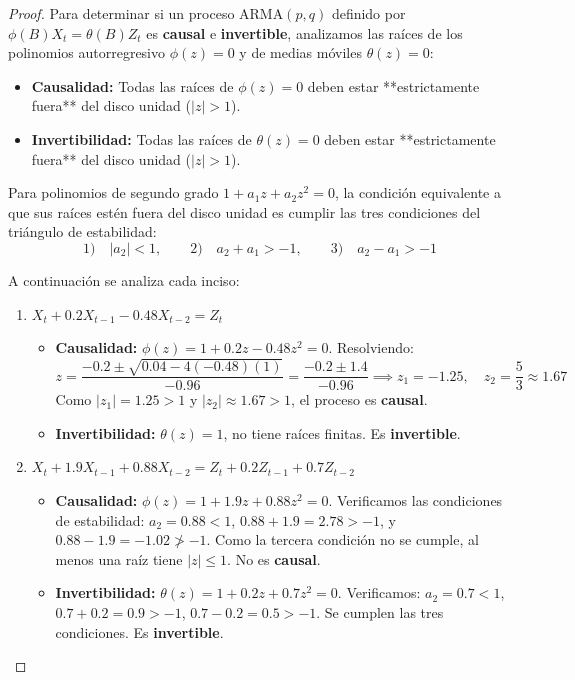 \documentclass[11pt,letterpaper]{article}
\begin{document}
\begin{proof}
Para determinar si un proceso $\text{ARMA}(p,q)$ definido por $\phi(B)X_t = \theta(B)Z_t$ es \textbf{causal} e \textbf{invertible}, analizamos las raíces de los polinomios autorregresivo $\phi(z) = 0$ y de medias móviles $\theta(z) = 0$:

\begin{itemize}
    \item \textbf{Causalidad:} Todas las raíces de $\phi(z) = 0$ deben estar **estrictamente fuera** del disco unidad ($|z| > 1$).
    \item \textbf{Invertibilidad:} Todas las raíces de $\theta(z) = 0$ deben estar **estrictamente fuera** del disco unidad ($|z| > 1$).
\end{itemize}

Para polinomios de segundo grado $1 + a_1 z + a_2 z^2 = 0$, la condición equivalente a que sus raíces estén fuera del disco unidad es cumplir las tres condiciones del triángulo de estabilidad:
\[
1) \quad |a_2| < 1, \qquad 2) \quad a_2 + a_1 > -1, \qquad 3) \quad a_2 - a_1 > -1
\]

A continuación se analiza cada inciso:

\begin{enumerate}
    \item $X_t + 0.2 X_{t-1} - 0.48 X_{t-2} = Z_t$
    \begin{itemize}
        \item \textbf{Causalidad:} $\phi(z) = 1 + 0.2z - 0.48z^2 = 0$. Resolviendo:
        \[
        z = \frac{-0.2 \pm \sqrt{0.04 - 4(-0.48)(1)}}{-0.96} = \frac{-0.2 \pm 1.4}{-0.96} \implies z_1 = -1.25, \quad z_2 = \frac{5}{3} \approx 1.67
        \]
        Como $|z_1| = 1.25 > 1$ y $|z_2| \approx 1.67 > 1$, el proceso es \textbf{causal}.
        \item \textbf{Invertibilidad:} $\theta(z) = 1$, no tiene raíces finitas. Es \textbf{invertible}.
    \end{itemize}

    \item $X_t + 1.9 X_{t-1} + 0.88 X_{t-2} = Z_t + 0.2 Z_{t-1} + 0.7 Z_{t-2}$
    \begin{itemize}
        \item \textbf{Causalidad:} $\phi(z) = 1 + 1.9z + 0.88z^2 = 0$.
        Verificamos las condiciones de estabilidad: $a_2 = 0.88 < 1$, $0.88 + 1.9 = 2.78 > -1$, y $0.88 - 1.9 = -1.02 \ngtr -1$. Como la tercera condición no se cumple, al menos una raíz tiene $|z| \le 1$. No es \textbf{causal}.
        \item \textbf{Invertibilidad:} $\theta(z) = 1 + 0.2z + 0.7z^2 = 0$.
        Verificamos: $a_2 = 0.7 < 1$, $0.7 + 0.2 = 0.9 > -1$, $0.7 - 0.2 = 0.5 > -1$. Se cumplen las tres condiciones. Es \textbf{invertible}.
    \end{itemize}


\end{enumerate}
\end{proof}
\end{document}
